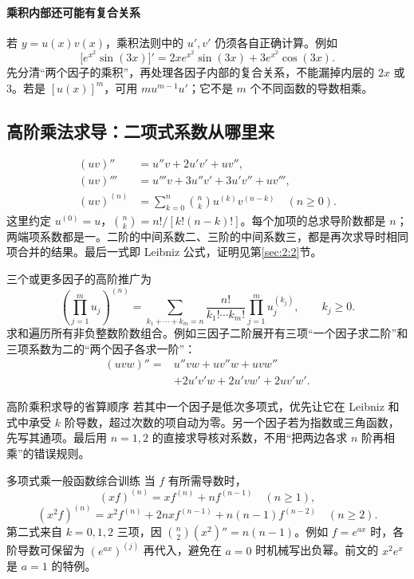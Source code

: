 \paragraph{乘积内部还可能有复合关系}
若 $y=u(x)v(x)$，乘积法则中的 $u',v'$ 仍须各自正确计算。例如
\[
 \bigl[e^{x^2}\sin(3x)\bigr]'
 =2xe^{x^2}\sin(3x)+3e^{x^2}\cos(3x).
\]
先分清“两个因子的乘积”，再处理各因子内部的复合关系，不能漏掉内层的 $2x$ 或 $3$。若是 $[u(x)]^m$，可用 $m u^{m-1}u'$；它不是 $m$ 个不同函数的导数相乘。

\subsection{高阶乘法求导：二项式系数从哪里来}\label{r2:product:higher}
\begin{align*}
 (uv)''&=u''v+2u'v'+uv'',\\
 (uv)'''&=u'''v+3u''v'+3u'v''+uv''',\\
 (uv)^{(n)}&=\sum_{k=0}^{n}\binom nk u^{(k)}v^{(n-k)}\quad(n\ge0).
\end{align*}
这里约定 $u^{(0)}=u$，$\binom nk=n!/[k!(n-k)!]$。每个加项的总求导阶数都是 $n$；两端项系数都是一。二阶的中间系数二、三阶的中间系数三，都是再次求导时相同项合并的结果。最后一式即 Leibniz 公式，证明见第\ref{sec:2:2}节。

三个或更多因子的高阶推广为
\[
 \left(\prod_{j=1}^m u_j\right)^{(n)}
 =\sum_{k_1+\cdots+k_m=n}
   \frac{n!}{k_1!\cdots k_m!}\prod_{j=1}^m u_j^{(k_j)},
 \qquad k_j\ge0.
\]
求和遍历所有非负整数阶数组合。例如三因子二阶展开有三项“一个因子求二阶”和三项系数为二的“两个因子各求一阶”：
\begin{align*}
 (uvw)''={}&u''vw+uv''w+uvw''\\
 &+2u'v'w+2u'vw'+2uv'w'.
\end{align*}

\begin{method}{高阶乘积求导的省算顺序}
若其中一个因子是低次多项式，优先让它在 Leibniz 和式中承受 $k$ 阶导数，超过次数的项自动为零。另一个因子若为指数或三角函数，先写其通项。最后用 $n=1,2$ 的直接求导核对系数，不用“把两边各求 $n$ 阶再相乘”的错误规则。
\end{method}

\begin{example}{多项式乘一般函数}{综合训练}
当 $f$ 有所需导数时，
\[
 (xf)^{(n)}=xf^{(n)}+nf^{(n-1)}\quad(n\ge1),
\]
\[
 (x^2f)^{(n)}=x^2f^{(n)}+2nxf^{(n-1)}+n(n-1)f^{(n-2)}\quad(n\ge2).
\]
第二式来自 $k=0,1,2$ 三项，因 $\binom n2(x^2)''=n(n-1)$。例如 $f=e^{ax}$ 时，各阶导数可保留为 $(e^{ax})^{(j)}$ 再代入，避免在 $a=0$ 时机械写出负幂。前文的 $x^2e^x$ 是 $a=1$ 的特例。
\end{example}

